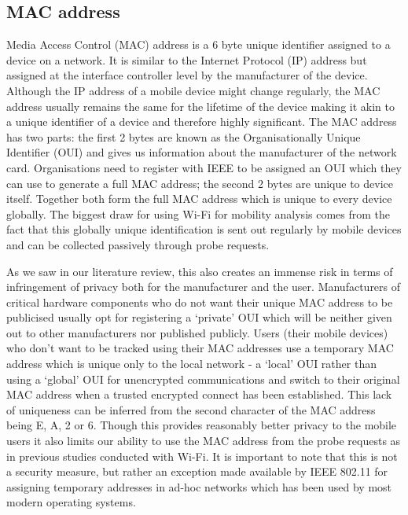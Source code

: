 \subsection{MAC address}
Media Access Control (MAC) address is a 6 byte unique identifier assigned to a device on a network.
It is similar to the Internet Protocol (IP) address but assigned at the interface controller level by the manufacturer of the device.
Although the IP address of a mobile device might change regularly, the MAC address usually remains the same for the lifetime of the device making it akin to a unique identifier of a device and therefore highly significant.
The MAC address has two parts: the first 2 bytes are known as the Organisationally Unique Identifier (OUI) and gives us information about the manufacturer of the network card.
Organisations need to register with IEEE to be assigned an OUI which they can use to generate a full MAC address;
the second 2 bytes are unique to device itself.
Together both form the full MAC address which is unique to every device globally.
The biggest draw for using Wi-Fi for mobility analysis comes from the fact that this globally unique identification is sent out regularly by mobile devices and can be collected passively through probe requests.

As we saw in our literature review, this also creates an immense risk in terms of infringement of privacy both for the manufacturer and the user.
Manufacturers of critical hardware components who do not want their unique MAC address to be publicised usually opt for registering a `private' OUI which will be neither given out to other manufacturers nor published publicly.
Users (their mobile devices) who don't want to be tracked using their MAC addresses use a temporary MAC address which is unique only to the local network - a `local' OUI rather than using a `global' OUI for unencrypted communications and switch to their original MAC address when a trusted encrypted connect has been established.
This lack of uniqueness can be inferred from the second character of the MAC address being E, A, 2 or 6.
Though this provides reasonably better privacy to the mobile users it also limits our ability to use the MAC address from the probe requests as in previous studies conducted with Wi-Fi.
It is important to note that this is not a security measure, but rather an exception made available by IEEE 802.11 for assigning temporary addresses in ad-hoc networks which has been used by most modern operating systems.

